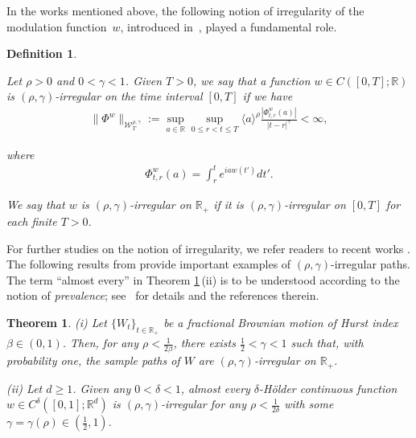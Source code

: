 \documentclass[letterpaper, 11pt,  reqno]{amsart}
\newtheorem{definition}[theorem]{Definition}
\newtheorem{oldtheorem}{Theorem}
\newcommand{\1}{\hspace{0.5mm}\textup{I}\hspace{0.5mm}}
\newcommand{\noi}{\noindent}
\newcommand{\R}{\mathbb{R}}
\newcommand{\be}{\beta}
\newcommand{\dl}{\delta}
\newcommand{\g}{\gamma}
\newcommand{\W}{\mathcal{W}}
\numberwithin{equation}{section}
\numberwithin{theorem}{section}
\begin{document}
In the works \cite{CG1, CGLLO1} mentioned above, 
the following   notion of irregularity of the modulation function~$w$, 
introduced in~\cite{CatellierGubinelli, CG1}, 
played a fundamental role.

\begin{definition}
\label{DEF:ir}
\rm

Let $\rho>0$ and  $0 < \g < 1$.
Given $T > 0$, we say that a function $w\in C([0,T];\R)$ is $(\rho,\g)$-irregular 
on the time interval $[0, T]$  if we have
\begin{align}
\|\Phi^w\|_{  \W^{\rho,\g}_T} 
:= \sup_{a\in \R} \sup_{0\leq r < t\leq T} \langle a \rangle^\rho \frac{|\Phi^w_{t,r}(a)|}{|t-r|^\g} 
< \infty, 
\label{rho1}
\end{align}


\noi
where 
\begin{align}
\Phi^w_{t,r}(a)
=\int_r^t e^{i  a w(t') } d t'.
\label{rho2}
\end{align}


\noi
We say that $w$ is 
$(\rho,\g)$-irregular 
on $\R_+$  if it is 
$(\rho,\g)$-irregular 
on $[0, T]$ for each finite $T > 0$.


\end{definition}


For further studies on the notion of irregularity, 
we refer readers to 
 recent works \cite{GG, RT}.
The following results from \cite{CG1, GG}
provide important examples of $(\rho, \g)$-irregular paths.
The term   ``almost every''
in Theorem \ref{THM:A}\,(ii)
 is to be understood according to the notion of {\it prevalence}; see~\cite{GG} for details and the  references therein.


 
\begin{oldtheorem}
\label{THM:A}
\textup{(i)}
Let $\{W_t\}_{t\in \R_+}$ be a fractional Brownian motion 
of Hurst index $\be\in(0,1)$.
Then, 
for any $\rho < \frac{1}{2\be}$,  
there exists $\frac 12 < \g < 1$
such that,  with probability one,  the sample paths of 
$W$ are $(\rho,\g)$-irregular on $\R_+$.



\smallskip

\noi
\textup{(ii)}
Let  $d \ge 1$.
Given  any $0 < \delta< 1$, almost every $\dl$-H\"older continuous  function $w \in C^\delta([0,1];\R^d)$ 
 is $(\rho,\g)$-irregular for any $\rho < \frac1{2\delta}$ with  some $\gamma = \gamma(\rho) \in (\frac 12,1)$.

\end{oldtheorem}
\end{document}
